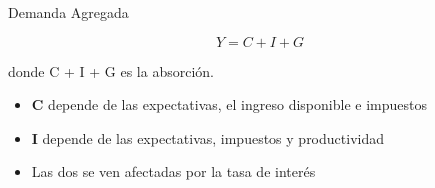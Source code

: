\documentclass{beamer}
\begin{document}

\begin{frame}{Demanda Agregada}

    \begin{itemize}
\begin{tcolorbox}[width=4in,
                  interior hidden,
                  boxsep=0pt,
                  left=0pt,
                  right=0pt,
                  top=2pt,
                  ]%
$$ Y = C + I + G $$
\end{tcolorbox}

    \end{itemize}
    
\centering donde C + I + G es la absorción.

\vspace{1cm}

 \begin{itemize}
        \item \textbf{C} depende de las expectativas, el ingreso disponible e impuestos
        \item \textbf{I} depende de las expectativas, impuestos y productividad
        \item Las dos se ven afectadas por la tasa de interés
    \end{itemize}

\end{frame}

\end{document}

